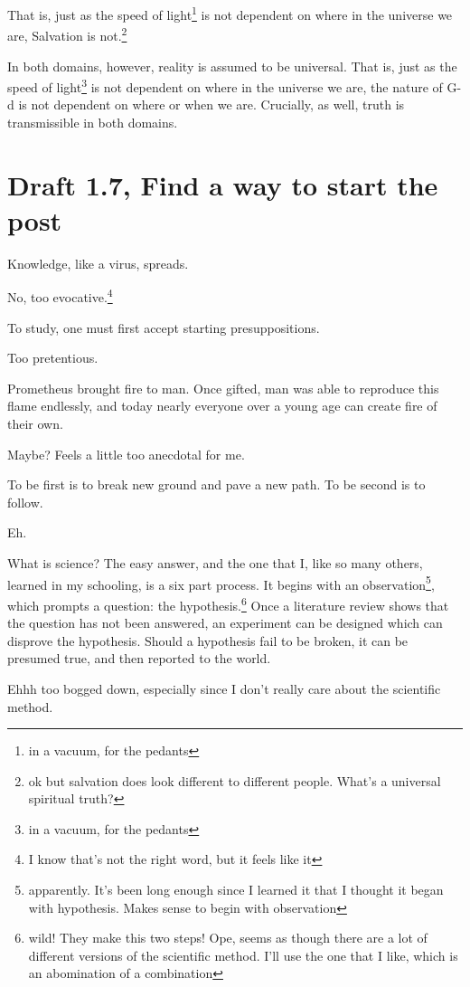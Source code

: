 \documentclass[12pt]{article}[titlepage]
\renewcommand{\,}{\textsuperscript{,}}
\begin{document}
That is, just as the speed of light\footnote{in a vacuum, for the pedants} is not dependent on where in the universe we are, Salvation is not.\footnote{ok but salvation does look different to different people. What's a universal spiritual truth?}

In both domains, however, reality is assumed to be universal.
That is, just as the speed of light\footnote{in a vacuum, for the pedants} is not dependent on where in the universe we are, the nature of G-d is not dependent on where or when we are.
Crucially, as well, truth is transmissible in both domains.

\section{Draft 1.7, Find a way to start the post}
Knowledge, like a virus, spreads.

No, too evocative.\footnote{I know that's not the right word, but it feels like it}

To study, one must first accept starting presuppositions.

Too pretentious.

Prometheus brought fire to man.
Once gifted, man was able to reproduce this flame endlessly, and today nearly everyone over a young age can create fire of their own.

Maybe? Feels a little too anecdotal for me.

To be first is to break new ground and pave a new path.
To be second is to follow.

Eh.

What is science?
The easy answer, and the one that I, like so many others, learned in my schooling, is a six part process.
It begins with an observation\footnote{apparently. It's been long enough since I learned it that I thought it began with hypothesis. Makes sense to begin with observation}, which prompts a question: the hypothesis.\footnote{wild! They make this two steps! Ope, seems as though there are a lot of different versions of the scientific method. I'll use the one that I like, which is an abomination of a combination}
Once a literature review shows that the question has not been answered, an experiment can be designed which can disprove the hypothesis.
Should a hypothesis fail to be broken, it can be presumed true, and then reported to the world.

Ehhh too bogged down, especially since I don't really care about the scientific method.
\end{document}
